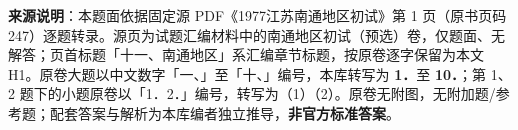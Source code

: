 


\begin{gktip}
\textbf{来源说明}：本题面依据固定源 PDF《1977江苏南通地区初试》第 1 页（原书页码 247）逐题转录。源页为试题汇编材料中的南通地区初试（预选）卷，仅题面、无解答；页首标题「十一、南通地区」系汇编章节标题，按原卷逐字保留为本文 H1。原卷大题以中文数字「一、」至「十、」编号，本库转写为 \textbf{1．}至 \textbf{10．}；第 1、2 题下的小题原卷以「1．2．」编号，转写为（1）（2）。原卷无附图，无附加题/参考题；配套答案与解析为本库编者独立推导，\textbf{非官方标准答案}。
\end{gktip}

\par\medskip

